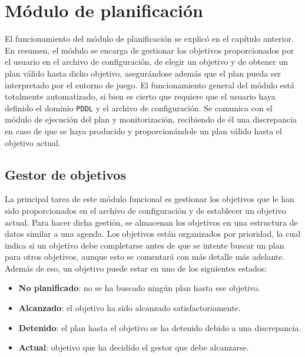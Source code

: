 \section{Módulo de planificación}

El funcionamiento del módulo de planificación se explicó en el capítulo anterior. En resumen, el
módulo se encarga de gestionar los objetivos proporcionados por el usuario en el archivo de
configuración, de elegir un objetivo y de obtener un plan válido hasta dicho objetivo, asegurándose
además que el plan pueda ser interpretado por el entorno de juego. El funcionamiento general
del módulo está totalmente automatizado, si bien es cierto que requiere que el usuario haya
definido el dominio \texttt{PDDL} y el archivo de configuración. Se comunica con el módulo de
ejecución del plan y monitorización, recibiendo de él una discrepancia en caso de que se haya
producido y proporcionándole un plan válido hasta el objetivo actual.

\subsection{Gestor de objetivos}

La principal tarea de este módulo funcional es gestionar los objetivos que le han sido proporcionados
en el archivo de configuración y de establecer un objetivo actual. Para hacer dicha gestión, se almacenan
los objetivos en una estructura de datos similar a una agenda. Los objetivos están organizados
por prioridad, la cual indica si un objetivo debe completarse antes de que se intente buscar un plan
para otros objetivos, aunque esto se comentará con más detalle más adelante. Además de eso, un objetivo
puede estar en uno de los siguientes estados:

\begin{itemize}[label=\textbullet]
    \item \textbf{No planificado}: no se ha buscado ningún plan hasta ese objetivo.
    \item \textbf{Alcanzado}: el objetivo ha sido alcanzado satisfactoriamente.
    \item \textbf{Detenido}: el plan hasta el objetivo se ha detenido debido a una discrepancia.
    \item \textbf{Actual}: objetivo que ha decidido el gestor que debe alcanzarse.
\end{itemize}

